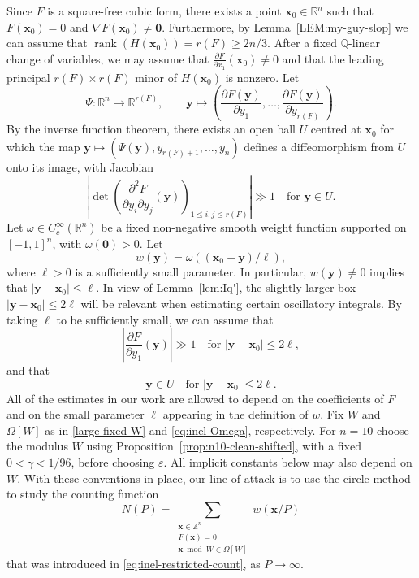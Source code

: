 \documentclass[a4paper,11pt, twoside,reqno]{amsart}
\theoremstyle{plain}
\theoremstyle{definition}
\theoremstyle{remark}
\newcommand{\F}{\mathbb{F}}
\newcommand{\Z}{\mathbb{Z}}
\newcommand{\bfx}{\bm{x}}
\newcommand{\bfy}{\bm{y}}
\newcommand{\RR}{\mathbb{R}}
\newcommand{\QQ}{\mathbb{Q}}
\DeclareMathOperator{\rank}{rank}
\newcommand{\ve}{\varepsilon}
\renewcommand{\le}{\leqslant}
\renewcommand{\leq}{\leqslant}
\renewcommand{\ge}{\geqslant}
\numberwithin{equation}{section}
\begin{document}
Since $F$ is a square-free cubic form,
there exists a point $\bm{x}_0\in \RR^n$ such that $F(\bm{x}_0)=0$ and $\nabla F(\bm{x}_0)\neq \bm{0}$.
Furthermore, by Lemma~\ref{LEM:my-guy-slop} we can assume that
$\rank(H(\bm{x}_0)) = r(F) \ge 2n/3$.
After a fixed $\QQ$-linear change of variables,
we may assume that $\frac{\partial F}{\partial x_1}(\bm{x}_0)\neq 0$
and that the leading principal $r(F) \times r(F)$ minor of $H(\bm{x}_0)$ is nonzero.
Let
\begin{equation}\label{eq:Psi}
\Psi \colon \RR^n\to \RR^{r(F)},
\qquad \bfy\mapsto
\left(\frac{\partial F(\bfy)}{\partial y_1},\dots,\frac{\partial F(\bfy)}{\partial y_{r(F)}}\right).
\end{equation}
By the inverse function theorem, there exists an open ball $U$ centred at $\bfx_0$ for which
the map $\bfy\mapsto \left(\Psi(\bm{y}),y_{r(F)+1},\dots,y_n\right)$
defines a diffeomorphism from $U$ onto its image,
with Jacobian
\begin{equation}\label{eq:smoothsub''}
\left|\det\left(\frac{\partial^2F}
{\partial y_i\partial y_j}(\bfy)\right)_{1\leq i,j\leq r(F)}\right| \gg 1
\quad \text{for }\bfy\in U.
\end{equation}
Let $\omega\in C_c^\infty(\RR^n)$ be a fixed non-negative smooth weight function supported on  $ [-1,1]^n$, with $\omega(\bm0)>0$. 
Let 
\[
w(\bfy)=\omega((\bm{x}_0-\bfy)/\ell),
\]
where $\ell>0$ is a sufficiently small parameter.
In particular, $w(\bfy)\neq 0$ implies that $|\bfy-\bm{x}_0|\leq \ell$.
In view of Lemma~\ref{lem:Iq'},
the slightly larger box $|\bfy-\bfx_0| \le 2\ell$ will be relevant
when estimating certain oscillatory integrals.
By taking $\ell$ to be sufficiently small, we can assume that 
\begin{equation}\label{eq:smoothsub}
\left|\frac{\partial F}{\partial y_1}(\bfy)\right| \gg 1 \quad
\text{for }|\bfy-\bfx_0| \le 2\ell,
\end{equation}
and that
\begin{equation}
\label{eq:diffU}
\bfy\in U \quad
\text{for }|\bfy-\bfx_0| \le 2\ell.
\end{equation}
All of the estimates in our work are allowed to depend on the coefficients of $F$ and on the small parameter $\ell$ appearing in the definition of $w$. 
Fix $W$ and $\Omega[W]$ as in \eqref{large-fixed-W} and 
\eqref{eq:inel-Omega}, respectively.
For $n=10$ choose the modulus $W$ using Proposition~\ref{prop:n10-clean-shifted},
with a fixed $0<\gamma<1/96$, before choosing $\ve$.
All implicit constants below may also depend on $W$.
With these conventions in place,
our line of attack is to use the circle method to study the counting function
\[
N(P)
= \sum_{\substack{\bfx\in\Z^n\\F(\bfx)=0\\
\bfx\bmod W\in\Omega[W]}}
w(\bfx/P)
\]
that was introduced in \eqref{eq:inel-restricted-count},
as $P\to \infty$.
\end{document}
